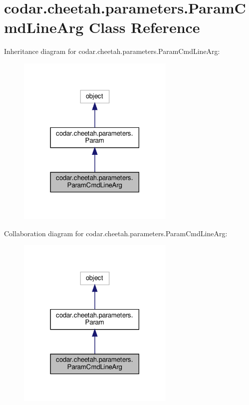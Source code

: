 \hypertarget{classcodar_1_1cheetah_1_1parameters_1_1_param_cmd_line_arg}{}\section{codar.\+cheetah.\+parameters.\+Param\+Cmd\+Line\+Arg Class Reference}
\label{classcodar_1_1cheetah_1_1parameters_1_1_param_cmd_line_arg}


Inheritance diagram for codar.\+cheetah.\+parameters.\+Param\+Cmd\+Line\+Arg\+:
\nopagebreak
\begin{figure}[H]
\begin{center}
\leavevmode
\includegraphics[width=213pt]{classcodar_1_1cheetah_1_1parameters_1_1_param_cmd_line_arg__inherit__graph}
\end{center}
\end{figure}


Collaboration diagram for codar.\+cheetah.\+parameters.\+Param\+Cmd\+Line\+Arg\+:
\nopagebreak
\begin{figure}[H]
\begin{center}
\leavevmode
\includegraphics[width=213pt]{classcodar_1_1cheetah_1_1parameters_1_1_param_cmd_line_arg__coll__graph}
\end{center}
\end{figure}
